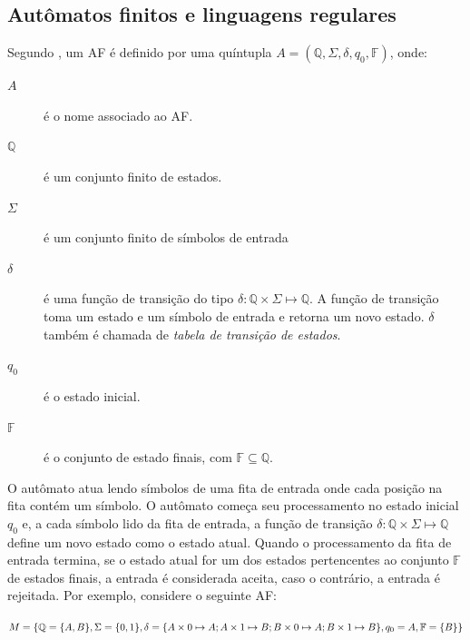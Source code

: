 \documentclass[12pt,a4paper]{article}
\begin{document}
\subsection{Autômatos finitos e linguagens regulares}

Segundo , um AF é definido por
uma quíntupla $A = (\mathbb{Q},\Sigma,\delta,q_0,\mathbb{F})$, onde:

\begin{description}
\item[$A$] é o nome associado ao AF.
\item[$\mathbb{Q}$] é um conjunto finito de estados.
\item[$\Sigma$] é um conjunto finito de símbolos de entrada
\item[$\delta$] é uma função de transição do tipo $\delta: \mathbb{Q} \times \Sigma \mapsto \mathbb{Q}$.
A função de transição toma um estado e um símbolo de entrada e retorna um novo estado.
$\delta$ também é chamada de \textit{tabela de transição de estados}.
\item[$q_0$] é o estado inicial.
\item[$\mathbb{F}$] é o conjunto de estado finais, com $\mathbb{F} \subseteq \mathbb{Q}$.
\end{description}

O autômato atua lendo símbolos de uma fita de entrada onde cada posição na fita
contém um símbolo. O autômato começa seu processamento no estado inicial $q_0$ e,
a cada símbolo lido da fita de entrada, a função de transição
$\delta: \mathbb{Q} \times \Sigma \mapsto \mathbb{Q}$ define um novo estado como o estado atual.
Quando o processamento da fita de entrada termina, se o estado atual for
um dos estados pertencentes ao conjunto $\mathbb{F}$ de estados finais, a entrada é
considerada aceita, caso o contrário, a entrada é rejeitada. Por exemplo,
considere o seguinte AF:

\begin{center}
$M = \{ \mathbb{Q} = \{A,B\}, \break \Sigma = \{0,1\}, \break
\delta = \{A \times 0 \mapsto A; A \times 1 \mapsto B; B \times 0 \mapsto A; B \times 1 \mapsto B\}, \break
q_0 = A, \break \mathbb{F} = \{B\} \}$
\end{center}
\end{document}
